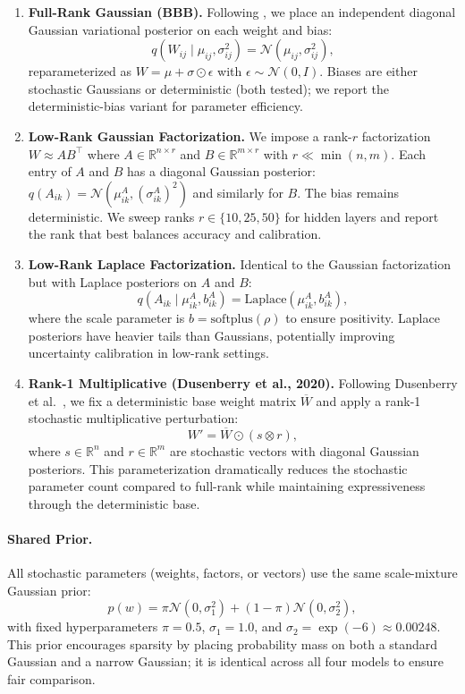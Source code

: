 \documentclass{article}
\theoremstyle{plain}
\theoremstyle{definition}
\theoremstyle{remark}
\begin{document}
\begin{enumerate}
    \item \textbf{Full-Rank Gaussian (BBB).} Following \cite{blundell2015weight}, we place an independent diagonal Gaussian variational posterior on each weight and bias:
    \[
    q(W_{ij} \mid \mu_{ij}, \sigma_{ij}^2) = \mathcal{N}(\mu_{ij}, \sigma_{ij}^2),
    \]
    reparameterized as $W = \mu + \sigma \odot \epsilon$ with $\epsilon \sim \mathcal{N}(0, I)$. Biases are either stochastic Gaussians or deterministic (both tested); we report the deterministic-bias variant for parameter efficiency.
    
    \item \textbf{Low-Rank Gaussian Factorization.} We impose a rank-$r$ factorization $W \approx AB^\top$ where $A \in \mathbb{R}^{n \times r}$ and $B \in \mathbb{R}^{m \times r}$ with $r \ll \min(n, m)$. Each entry of $A$ and $B$ has a diagonal Gaussian posterior: $q(A_{ik}) = \mathcal{N}(\mu^A_{ik}, (\sigma^A_{ik})^2)$ and similarly for $B$. The bias remains deterministic. We sweep ranks $r \in \{10, 25, 50\}$ for hidden layers and report the rank that best balances accuracy and calibration.
    
    \item \textbf{Low-Rank Laplace Factorization.} Identical to the Gaussian factorization but with Laplace posteriors on $A$ and $B$:
    \[
    q(A_{ik} \mid \mu^A_{ik}, b^A_{ik}) = \text{Laplace}(\mu^A_{ik}, b^A_{ik}),
    \]
    where the scale parameter is $b = \text{softplus}(\rho)$ to ensure positivity. Laplace posteriors have heavier tails than Gaussians, potentially improving uncertainty calibration in low-rank settings.
    
    \item \textbf{Rank-1 Multiplicative (Dusenberry et al., 2020).} Following Dusenberry et al.~\cite{dusenberry2020efficient}, we fix a deterministic base weight matrix $\overline{W}$ and apply a rank-1 stochastic multiplicative perturbation:
    \[
    W' = \overline{W} \odot (s \otimes r),
    \]
    where $s \in \mathbb{R}^n$ and $r \in \mathbb{R}^m$ are stochastic vectors with diagonal Gaussian posteriors. This parameterization dramatically reduces the stochastic parameter count compared to full-rank while maintaining expressiveness through the deterministic base.
\end{enumerate}

\paragraph{Shared Prior.}
All stochastic parameters (weights, factors, or vectors) use the same scale-mixture Gaussian prior:
\[
p(w) = \pi \mathcal{N}(0, \sigma_1^2) + (1 - \pi) \mathcal{N}(0, \sigma_2^2),
\]
with fixed hyperparameters $\pi = 0.5$, $\sigma_1 = 1.0$, and $\sigma_2 = \exp(-6) \approx 0.00248$. This prior encourages sparsity by placing probability mass on both a standard Gaussian and a narrow Gaussian; it is identical across all four models to ensure fair comparison.
\end{document}
